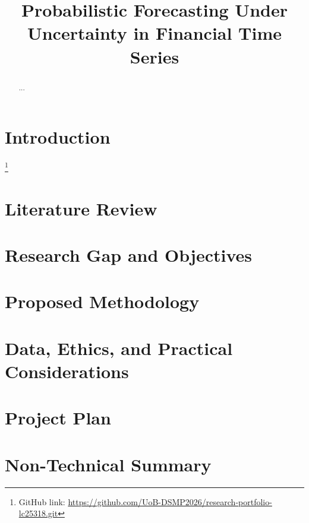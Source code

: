 \documentclass[conference]{IEEEtran}
\begin{document}
\title{Probabilistic Forecasting Under Uncertainty in Financial Time Series}

\author{
}

\maketitle

\begin{abstract}
...
\end{abstract}

\begin{IEEEkeywords}
\end{IEEEkeywords}

\section{Introduction}
\footnote{GitHub link: \url{https://github.com/UoB-DSMP2026/research-portfolio-lc25318.git}}

\section{Literature Review}

\section{Research Gap and Objectives}

\section{Proposed Methodology}

\section{Data, Ethics, and Practical Considerations}

\section{Project Plan}

\section{Non-Technical Summary}



\end{document}
